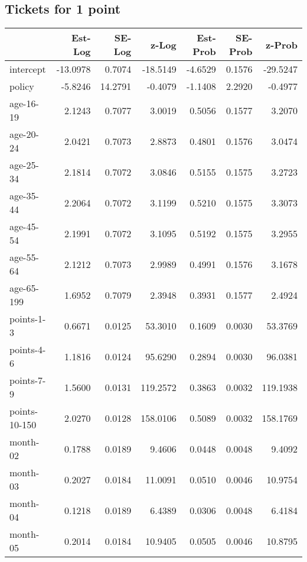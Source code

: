 \documentclass[10pt]{article}
\begin{document}

\subsection{Tickets for 1 point}




\begin{table}[ht]
\centering
\begin{tabular}{lrrrrrr}
  \hline
 & Est-Log & SE-Log & z-Log & Est-Prob & SE-Prob & z-Prob \\ 
  \hline
intercept & -13.0978 & 0.7074 & -18.5149 & -4.6529 & 0.1576 & -29.5247 \\ 
  policy & -5.8246 & 14.2791 & -0.4079 & -1.1408 & 2.2920 & -0.4977 \\ 
  age-16-19 & 2.1243 & 0.7077 & 3.0019 & 0.5056 & 0.1577 & 3.2070 \\ 
  age-20-24 & 2.0421 & 0.7073 & 2.8873 & 0.4801 & 0.1576 & 3.0474 \\ 
  age-25-34 & 2.1814 & 0.7072 & 3.0846 & 0.5155 & 0.1575 & 3.2723 \\ 
  age-35-44 & 2.2064 & 0.7072 & 3.1199 & 0.5210 & 0.1575 & 3.3073 \\ 
  age-45-54 & 2.1991 & 0.7072 & 3.1095 & 0.5192 & 0.1575 & 3.2955 \\ 
  age-55-64 & 2.1212 & 0.7073 & 2.9989 & 0.4991 & 0.1576 & 3.1678 \\ 
  age-65-199 & 1.6952 & 0.7079 & 2.3948 & 0.3931 & 0.1577 & 2.4924 \\ 
  points-1-3 & 0.6671 & 0.0125 & 53.3010 & 0.1609 & 0.0030 & 53.3769 \\ 
  points-4-6 & 1.1816 & 0.0124 & 95.6290 & 0.2894 & 0.0030 & 96.0381 \\ 
  points-7-9 & 1.5600 & 0.0131 & 119.2572 & 0.3863 & 0.0032 & 119.1938 \\ 
  points-10-150 & 2.0270 & 0.0128 & 158.0106 & 0.5089 & 0.0032 & 158.1769 \\ 
  month-02 & 0.1788 & 0.0189 & 9.4606 & 0.0448 & 0.0048 & 9.4092 \\ 
  month-03 & 0.2027 & 0.0184 & 11.0091 & 0.0510 & 0.0046 & 10.9754 \\ 
  month-04 & 0.1218 & 0.0189 & 6.4389 & 0.0306 & 0.0048 & 6.4184 \\ 
  month-05 & 0.2014 & 0.0184 & 10.9405 & 0.0505 & 0.0046 & 10.8795 \\ 

\end{tabular}
\end{table}
\end{document}

